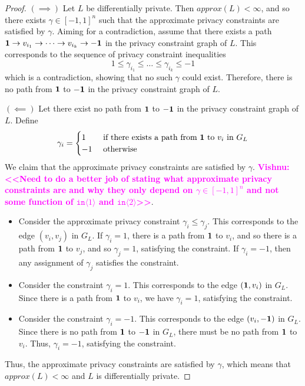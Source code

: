 \documentclass[12pt]{article}
\newcommand{\brangle}[1]{\langle#1 \rangle}
\newcommand{\todo}[2]{\textcolor{#1}{\textbf{#2}}}
\newcommand{\vishnu}[1]{\todo{magenta}{Vishnu: <<#1>>}}
\theoremstyle{definition}
\begin{document}
\begin{proof}
    $(\implies)$ Let $L$ be differentially private. Then $approx(L) < \infty$, and so there exists $\gamma \in [-1, 1]^n$ such that the approximate privacy constraints are satisfied by $\gamma$. Aiming for a contradiction, assume that there exists a path ${\bf 1} \to v_{i_1} \to \dots \to v_{i_k} \to {\bf -1}$ in the privacy constraint graph of $L$. This corresponds to the sequence of privacy constraint inequalities
    \[1 \leq \gamma_{i_1} \leq \dots \leq \gamma_{i_k} \leq -1\]
    which is a contradiction, showing that no such $\gamma$ could exist. Therefore, there is no path from $\bf 1$ to $\bf -1$ in the privacy constraint graph of $L$.

    $(\impliedby)$ Let there exist no path from $\bf 1$ to $\bf -1$ in the privacy constraint graph of $L$. Define 
    \begin{align*}
        \gamma_i = \begin{cases}
            1 &\text{ if there exists a path from } {\bf 1} \text{ to } v_i \text{ in } G_L \\
            -1 &\text{ otherwise}
        \end{cases}
    \end{align*}
    We claim that the approximate privacy constraints are satisfied by $\gamma$. \vishnu{Need to do a better job of stating what approximate privacy constraints are and why they only depend on $\gamma \in [-1, 1]^n$ and not some function of $\texttt{in}\brangle{1}$ and $\texttt{in}\brangle{2}$}.
    
    \begin{itemize}
        \item Consider the approximate privacy constraint $\gamma_i \leq \gamma_j$. This corresponds to the edge $(v_i, v_j)$ in $G_L$. If $\gamma_i = 1$, there is a path from $\bf 1$ to $v_i$, and so there is a path from $\bf 1$ to $v_j$, and so $\gamma_j = 1$, satisfying the constraint. If $\gamma_i = -1$, then any assignment of $\gamma_j$ satisfies the constraint. 
        \item Consider the constraint $\gamma_i = 1$. This corresponds to the edge $({\bf 1}, v_i)$ in $G_L$. Since there is a path from $\bf 1$ to $v_i$, we have $\gamma_i = 1$, satisfying the constraint.
        \item Consider the constraint $\gamma_i = -1$. This corresponds to the edge $(v_i, {\bf -1})$ in $G_L$. Since there is no path from $\bf 1$ to $\bf -1$ in $G_L$, there must be no path from $\bf 1$ to $v_i$. Thus, $\gamma_i = -1$, satisfying the constraint.
    \end{itemize}
    
    Thus, the approximate privacy constraints are satisfied by $\gamma$, which means that $approx(L) < \infty$ and $L$ is differentially private.
\end{proof}
\end{document}
